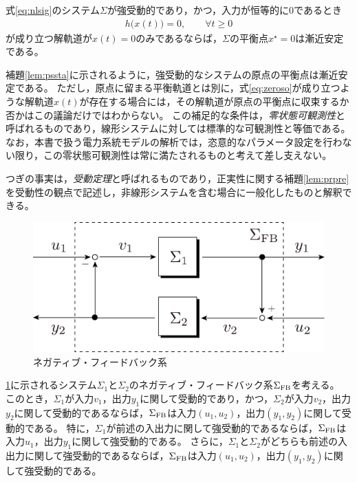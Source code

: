 \documentclass[tombow,dvipdfmx]{corona-a5}
\begin{document}
\begin{補題}[強受動的なシステムの漸近安定性]\label{lem:pssta}
式\ref{eq:nlsig}のシステム$\Sigma$が強受動的であり，かつ，入力が恒等的に0であるとき
\begin{align}\label{eq:zeroso}
h\bigl(
x(t)
\bigr)=0,\qquad
\forall t\geq 0
\end{align}
が成り立つ解軌道が$x(t)=0$のみであるならば，$\Sigma$の平衡点$x^{\star}=0$は漸近安定である。
\end{補題}

\begin{証明}
\end{証明}

補題\ref{lem:pssta}に示されるように，強受動的なシステムの原点の平衡点は漸近安定である。
ただし，原点に留まる平衡軌道とは別に，式\ref{eq:zeroso}が成り立つような解軌道$x(t)$が存在する場合には，その解軌道が原点の平衡点に収束するか否かはこの議論だけではわからない。
この補足的な条件は，\emph{零状態可観測性}と呼ばれるものであり，線形システムに対しては標準的な可観測性と等価である。
なお，本書で扱う電力系統モデルの解析では，恣意的なパラメータ設定を行わない限り，この零状態可観測性は常に満たされるものと考えて差し支えない。


つぎの事実は，\emph{受動定理}と呼ばれるものであり，正実性に関する補題\ref{lem:prpre}を受動性の観点で記述し，非線形システムを含む場合に一般化したものと解釈できる。

\begin{figure}[t]
  \centering
  \includegraphics[width = .50\linewidth]{figs/fbnlin}
  \caption{ネガティブ・フィードバック系}
  \label{fig:stasig12}
\end{figure}

\begin{定理}[受動定理]\label{thm:psthm}
\ref{fig:stasig12}に示されるシステム$\Sigma_1$と$\Sigma_2$のネガティブ・フィードバック系$\Sigma_{\rm FB}$を考える。
このとき，$\Sigma_1$が入力$v_1$，出力$y_1$に関して受動的であり，かつ，$\Sigma_2$が入力$v_2$，出力$y_2$に関して受動的であるならば，$\Sigma_{\rm FB}$は入力$(u_1,u_2)$，出力$(y_1,y_2)$に関して受動的である。
特に，$\Sigma_1$が前述の入出力に関して強受動的であるならば，$\Sigma_{\rm FB}$は入力$u_1$，出力$y_1$に関して強受動的である。
さらに，$\Sigma_1$と$\Sigma_2$がどちらも前述の入出力に関して強受動的であるならば，$\Sigma_{\rm FB}$は入力$(u_1,u_2)$，出力$(y_1,y_2)$に関して強受動的である。
\end{定理}
\end{document}
